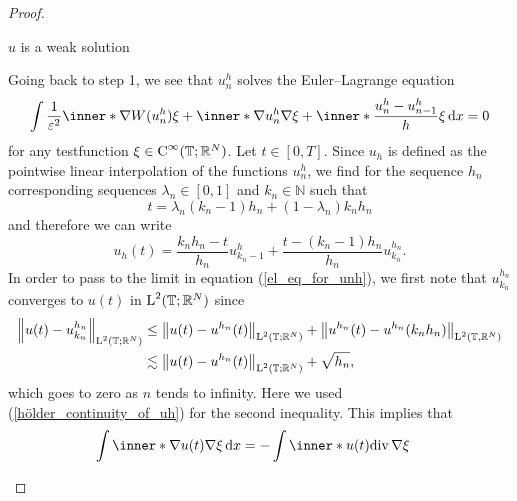 \begin{proof}
\begin{description}[wide=0pt]
		\item[Step 7:] $ u $ is a weak solution
		
		Going back to step 1, we see that $ u_{ n }^{ h } $ solves the Euler--Lagrange equation
		\begin{equation}
			\label{el_eq_for_unh}
			\int
			\frac{ 1 }{ \varepsilon^{ 2 } }
			\inner*{ \nabla W ( u_{ n }^{ h } ) }  { \xi }
			+
			\inner*{ \nabla u_{ n }^{ h } }{ \nabla \xi }
			+
			\inner*{ \frac{ u_{ n }^{ h } - u_{ n - 1 }^{ h } }{ h } }{ \xi }
			\dd{ x }
			=
			0
		\end{equation}
		for any testfunction $ \xi \in \operatorname{C}^{ \infty } ( \operatorname{\mathbb{T}} ; \mathbb{ R }^{ N } )  $.
		Let $ t \in [ 0 , T ] $. Since $ u_{ h } $ is defined as the pointwise linear interpolation of the functions $ u_{ n}^{ h } $, we find for the sequence $ h_{ n } $ corresponding sequences $ \lambda_{ n } \in [ 0 , 1 ] $ and $ k_{ n } \in \mathbb{ N }$ such that 
		\begin{equation*}
			t = \lambda_{ n } ( k_{ n } - 1 ) h_{ n } + ( 1 - \lambda_{ n } ) k_{ n } h_{ n } 
		\end{equation*}
		and therefore we can write
		\begin{equation*}
			u_{ h } ( t ) 
			=
			\frac{ k_{ n } h_{ n } - t }{ h_{ n } } u_{ k_{ n } - 1 }^{ h }
			+
			\frac{ t - ( k_{ n } - 1 ) h_{ n } }{ h_{ n } }
			u_{ k_{ n } }^{ h_{ n } }.
		\end{equation*}
		In order to pass to the limit in equation (\ref{el_eq_for_unh}), we first note that $ u_{ k_{ n } }^{ h_{ n } } $ converges to $ u ( t ) $ in $ \operatorname{L}^{ 2 } ( \operatorname{\mathbb{T}} ; \mathbb{ R }^{ N } ) $ since
		\begin{align*}
			\norm{ u ( t ) - u_{ k_{ n } }^{ h_{ n } } }_{ \operatorname{L}^{ 2 } ( \operatorname{\mathbb{T}} ; \mathbb{ R }^{ N } ) }
			& \leq
			\norm{ u ( t ) - u^{ h_{ n } } ( t ) }_{ \operatorname{L}^{ 2 } ( \operatorname{\mathbb{T}} ; \mathbb{ R }^{ N } ) }
			+
			\norm{ u^{ h_{ n } } ( t ) - u^{ h_{ n } } ( k_{n } h_{ n } ) }_{ \operatorname{L}^{ 2 } ( \operatorname{\mathbb{T}}, \mathbb{ R }^{ N } ) }
			\\
			& \lesssim
			\norm{ u ( t ) - u^{ h_{ n } } ( t ) }_{ \operatorname{L}^{ 2 } ( \operatorname{\mathbb{T}} ; \mathbb{ R }^{ N } ) }
			+ 
			\sqrt{ h_{ n } },
		\end{align*}
		which goes to zero as $ n $ tends to infinity. Here we used 
		(\ref{hölder_continuity_of_uh}) for the second inequality.
		This implies that 
		\begin{align*}
			\int
			\inner*{ \nabla u ( t ) }{ \nabla \xi }
			\dd{ x }
			& = 
			-
			\int
			\inner*{ u ( t ) }{ \divg \nabla \xi  }

\end{align*}
\end{description}
\end{proof}
